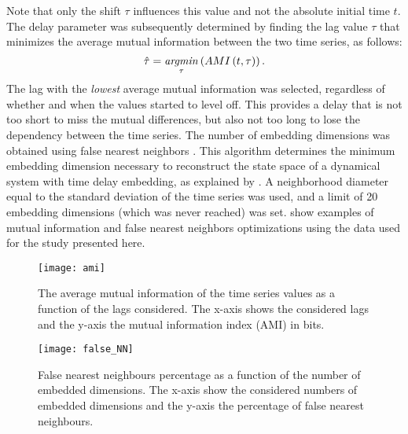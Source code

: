 Note that only the shift $\tau$ influences this value and not the absolute initial time $t$.
The delay parameter was subsequently determined by finding the lag value $\tau$ that minimizes the average mutual information between the two time series, as follows:
%
\begin{equation}
	\label{eq:delay_opt}
	\hat{\tau} = \operatorname*{\mathit{argmin}}_{\tau} \left( AMI\left( t, \tau \right) \right).
\end{equation}
\noindent
%
The lag with the \emph{lowest} average mutual information was selected, regardless of whether and when the values started to level off.
This provides a delay that is not too short to miss the mutual differences, but also not too long to lose the dependency between the time series.
The number of embedding dimensions was obtained using false nearest neighbors \citep{Kennel1992determining}.
This algorithm determines the minimum embedding dimension necessary to reconstruct the state space of a dynamical system with time delay embedding, as explained by \citet{Abarbanel1993local}.
A neighborhood diameter equal to the standard deviation of the time series was used, and a limit of 20 embedding dimensions (which was never reached) was set.
 show examples of mutual information and false nearest neighbors optimizations using the data used for the study presented here.
%
\begin{figure}
	\centering
	\begin{minipage}{.45\linewidth}
		\centering
		\texttt{[image: ami]}
		\caption[Average mutual information of time series as function of lag]
			{The average mutual information of the time series values as a function of the lags considered.
			The x-axis shows the considered lags and the y-axis the mutual information index (AMI) in bits.}
		\label{fig:ami}
	\end{minipage}%
	\hfill
	\begin{minipage}{.45\linewidth}
		\centering
		\texttt{[image: false\_NN]}
		\caption[Embedded dimensions optimization]
			{False nearest neighbours percentage as a function of the number of embedded dimensions.
			The x-axis show the considered numbers of embedded dimensions and the y-axis the percentage of false nearest neighbours.}
		\label{fig:false_nn}
	\end{minipage}	
\end{figure}
%
\addtocounter{equation}{1}
